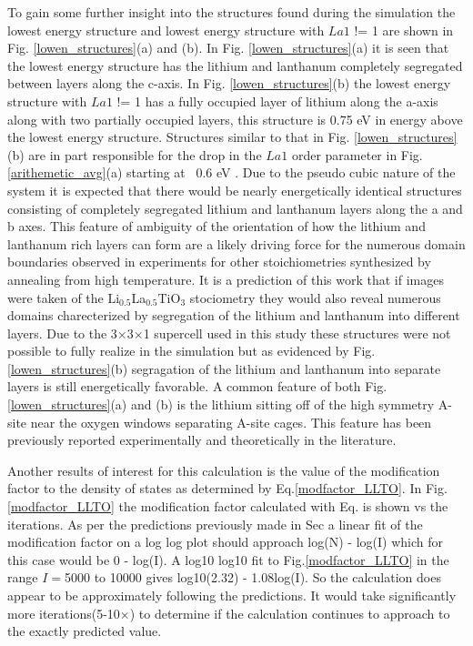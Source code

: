 \documentclass[aps,pre,reprint,superscriptaddress,showkeys]{revtex4-2}
\begin{document}
To gain some further insight into the structures found during the simulation the  lowest energy structure and lowest energy structure with $La1$ != 1 are  shown in  Fig. \ref{lowen_structures}(a) and (b). In Fig. \ref{lowen_structures}(a) it is seen that the lowest energy structure has the lithium and lanthanum completely segregated between layers along the c-axis. In Fig. \ref{lowen_structures}(b)  the  lowest energy structure with $La1$ != 1  has a fully occupied layer of lithium along the a-axis along with two partially occupied layers, this structure is 0.75 eV in energy above the lowest energy structure. Structures similar to that in Fig. \ref{lowen_structures}(b) are in part responsible for the drop in the $La1$ order parameter in Fig. \ref{arithemetic_avg}(a) starting at ~0.6 eV .  Due to the pseudo cubic nature of the system it is expected that there would be nearly energetically identical structures  consisting of completely segregated lithium and lanthanum layers along the a and b axes. This feature of ambiguity of the orientation of how the lithium and lanthanum rich layers can form  are a likely driving force for the numerous domain boundaries observed in experiments for other stoichiometries synthesized by annealing from high temperature\cite{imaginaryphonons,domainboundaries}. It is a prediction of this work that if images were taken of the Li$_0.5$La$_0.5$TiO$_3$ stociometry they would also reveal numerous domains charecterized by segregation of the lithium and lanthanum into different layers.  Due to the 3$\times$3$\times$1 supercell used in this study these structures were not possible to fully realize in the simulation but as evidenced by Fig. \ref{lowen_structures}(b) segragation of the lithium and lanthanum into separate layers is still energetically favorable. A common feature of both Fig. \ref{lowen_structures}(a) and (b) is the lithium sitting off of the high symmetry A-site near the oxygen windows separating A-site cages. This feature has been previously reported experimentally and theoretically in the literature\cite{Asitedistribution,imaginaryphonons,Li_La_ordering_computational,lithiumpos}. 

Another results of interest for this calculation is the value of the modification factor to the density of states as determined by Eq.\ref{modfactor_LLTO}. In Fig.\ref{modfactor_LLTO} the modification factor calculated with Eq.  \label{modfactor_LLTO} is shown vs the iterations. As per the predictions previously made in Sec   a linear fit of the modification factor on a log log plot should approach log(N) - log(I) which for this case would be 0 - log(I). A log10 log10 fit to Fig.\ref{modfactor_LLTO} in the range $I=$5000 to 10000 gives log10(2.32) - 1.08log(I). So the calculation does appear to be approximately following the predictions. It would take significantly more iterations(5-10$\times$) to determine if the calculation continues to approach to the exactly predicted value. 
\end{document}
